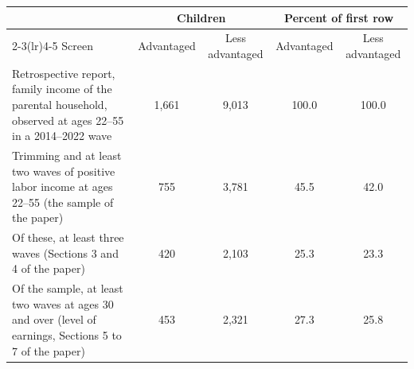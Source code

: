 \begin{tabular}{@{}p{6.0cm}cccc@{}}
\toprule
 & \multicolumn{2}{c}{Children} & \multicolumn{2}{c}{Percent of first row} \\
\cmidrule(lr){2-3}\cmidrule(lr){4-5}
Screen & Advantaged & Less advantaged & Advantaged & Less advantaged \\
\midrule
Retrospective report, family income of the parental household, observed at ages 22--55 in a 2014--2022 wave & 1,661 & 9,013 & 100.0 & 100.0 \\
Trimming and at least two waves of positive labor income at ages 22--55 (the sample of the paper) & 755 & 3,781 & 45.5 & 42.0 \\
Of these, at least three waves (Sections 3 and 4 of the paper) & 420 & 2,103 & 25.3 & 23.3 \\
Of the sample, at least two waves at ages 30 and over (level of earnings, Sections 5 to 7 of the paper) & 453 & 2,321 & 27.3 & 25.8 \\
\bottomrule
\end{tabular}
